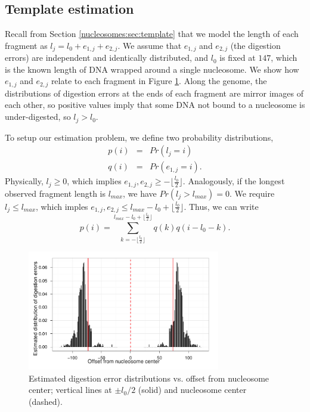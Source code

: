 \subsection{Template estimation}
\label{nucleosomes:sec:templateEstimation}

Recall from Section \ref{nucleosomes:sec:template} that we model the length of each fragment as $ l_j = l_0 + e_{1,j} + e_{2,j} $.
We assume that $e_{1,j}$ and $e_{2,j}$ (the digestion errors) are independent and identically distributed, and $l_0$ is fixed at $147$, which is the known length of DNA wrapped around a single nucleosome.
We show how $e_{1,j}$ and $e_{2,j}$ relate to each fragment in Figure \ref{nucleosomes:fig:digestErrors}.
Along the genome, the distributions of digestion errors at the ends of each fragment are mirror images of each other, so positive values imply that some DNA not bound to a nucleosome is under-digested, so $l_j > l_0$.

To setup our estimation problem, we define two probability distributions,
\begin{eqnarray}
 p(i) &=& Pr \left( l_j = i \right) \\
 q(i) &=& Pr \left( e_{1,j} = i \right).
\end{eqnarray}
Physically, $l_j \geq0$, which implies $e_{1,j}, e_{2,j} \geq - \lfloor \frac{l_0}{2} \rfloor$. Analogously, if the longest observed fragment length is
$l_{max}$, we have  $Pr \left( l_j > l_{max} \right) = 0$. We require $l_j\leq l_{max}$, which imples $e_{1,j}, e_{2,j} \leq l_{max} - l_0 + \lfloor \frac{l_0}{2} \rfloor$. Thus, we can write 
\begin{equation}
 p(i) = \sum_{k=-\lfloor \frac{l_0}{2} \rfloor}^{l_{max} - l_0 + \lfloor
\frac{l_0}{2} \rfloor} q(k) q(i - l_0 - k).
\end{equation}

\ifx\nofigures\undefined
\begin{figure}
\centering
\includegraphics[width=0.75\textwidth]{figures/nucleosomes/plotDigestionDist_histogram}
\caption{Estimated digestion error distributions vs. offset from nucleosome
center; vertical lines at $\pm l_0 / 2$ (solid) and nucleosome center (dashed).
\label{nucleosomes:fig:digestErrors}}
\end{figure}
\fi

